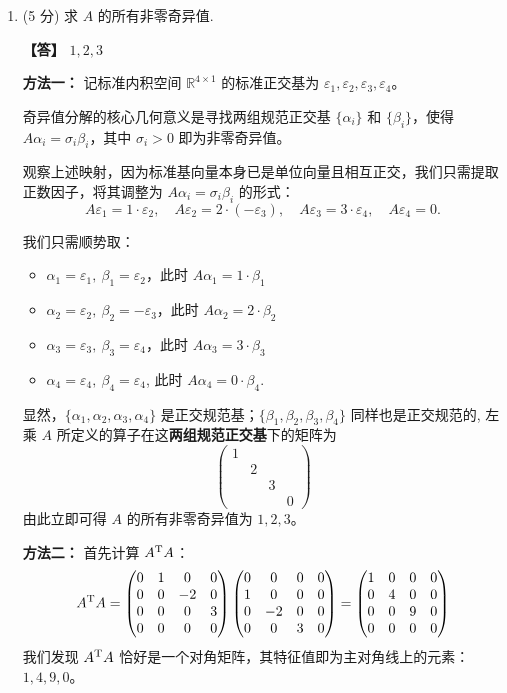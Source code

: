 \begin{enumerate}
\item (5 分) 求 $A$ 的所有非零奇异值.

\textbf{【答】} $1,2,3$

\textbf{方法一：} 记标准内积空间 $\mathbb{R}^{4\times1}$ 的标准正交基为 $\varepsilon_1,\varepsilon_2,\varepsilon_3,\varepsilon_4$。

奇异值分解的核心几何意义是寻找两组规范正交基 $\{\alpha_i\}$ 和 $\{\beta_i\}$，使得 $A\alpha_i=\sigma_i\beta_i$，其中 $\sigma_i>0$ 即为非零奇异值。

观察上述映射，因为标准基向量本身已是单位向量且相互正交，我们只需提取正数因子，将其调整为 $A\alpha_i=\sigma_i\beta_i$ 的形式：
\[
A\varepsilon_1=1\cdot\varepsilon_2,\quad
A\varepsilon_2=2\cdot(-\varepsilon_3),\quad
A\varepsilon_3=3\cdot\varepsilon_4,\quad
A\varepsilon_4=0.
\]

我们只需顺势取：
\begin{itemize}
\item $\alpha_1=\varepsilon_1,\ \beta_1=\varepsilon_2$，此时 $A\alpha_1=1\cdot\beta_1$
\item $\alpha_2=\varepsilon_2,\ \beta_2=-\varepsilon_3$，此时 $A\alpha_2=2\cdot\beta_2$
\item $\alpha_3=\varepsilon_3,\ \beta_3=\varepsilon_4$，此时 $A\alpha_3=3\cdot\beta_3$
\item $\alpha_4=\varepsilon_4,\ \beta_4=\varepsilon_4$, 此时 $A\alpha_4=0\cdot\beta_4$.
\end{itemize}

显然，$\{\alpha_1,\alpha_2,\alpha_3,\alpha_4\}$ 是正交规范基；$\{\beta_1,\beta_2,\beta_3,\beta_4\}$ 同样也是正交规范的, 
左乘 $A$ 所定义的算子在这\textbf{两组规范正交基}下的矩阵为
\[\begin{pmatrix}
1 & & & \\
 & 2 & & \\
 & & 3 & \\
 & & & 0
\end{pmatrix}\]
由此立即可得 $A$ 的所有非零奇异值为 $1,2,3$。

\textbf{方法二：} 首先计算 $A^{\rm T}A$：
\[A^{\rm T}A=
\begin{pmatrix}
0 & 1 & 0 & 0 \\
0 & 0 & -2 & 0 \\
0 & 0 & 0 & 3 \\
0 & 0 & 0 & 0
\end{pmatrix}
\begin{pmatrix}
0 & 0 & 0 & 0 \\
1 & 0 & 0 & 0 \\
0 & -2 & 0 & 0 \\
0 & 0 & 3 & 0
\end{pmatrix}
=
\begin{pmatrix}
1 & 0 & 0 & 0 \\
0 & 4 & 0 & 0 \\
0 & 0 & 9 & 0 \\
0 & 0 & 0 & 0
\end{pmatrix}\]
我们发现 $A^{\rm T}A$ 恰好是一个对角矩阵，其特征值即为主对角线上的元素：$1,4,9,0$。


\end{enumerate}
